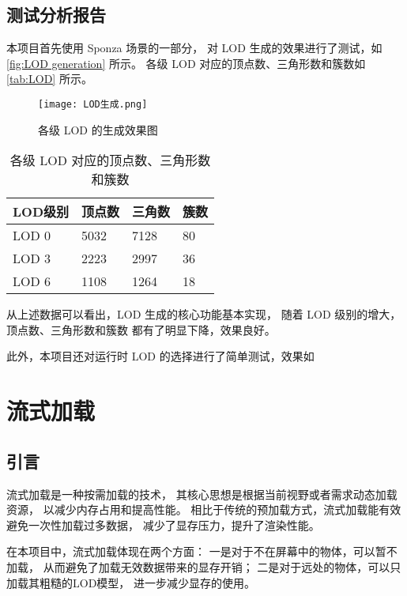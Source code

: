 \subsection{测试分析报告}

本项目首先使用 Sponza 场景的一部分，
对 LOD 生成的效果进行了测试，如\autoref{fig:LOD generation} 所示。
各级 LOD 对应的顶点数、三角形数和簇数如\autoref{tab:LOD} 所示。

\begin{figure}[!htb]
    \centering
    \texttt{[image: LOD生成.png]}
    \caption{\label{fig:LOD generation}各级 LOD 的生成效果图}
\end{figure}

\begin{table}[!htb]
    \caption{\label{tab:LOD}各级 LOD 对应的顶点数、三角形数和簇数}
    \begin{tabularx}{\linewidth}{|X<{\centering}|X<{\centering}|X<{\centering}|X<{\centering}|}
        \hline
        LOD级别 & 顶点数 & 三角数 & 簇数 \\ \hline
        LOD 0 & 5032 & 7128 & 80 \\ \hline
        LOD 3 & 2223 & 2997 & 36 \\ \hline
        LOD 6 & 1108 & 1264 & 18 \\ \hline
    \end{tabularx}
\end{table}

从上述数据可以看出，LOD 生成的核心功能基本实现，
随着 LOD 级别的增大，顶点数、三角形数和簇数
都有了明显下降，效果良好。

此外，本项目还对运行时 LOD 的选择进行了简单测试，效果如


\section{流式加载}

\subsection{引言}

流式加载是一种按需加载的技术，
其核心思想是根据当前视野或者需求动态加载资源，
以减少内存占用和提高性能。
相比于传统的预加载方式，流式加载能有效避免一次性加载过多数据，
减少了显存压力，提升了渲染性能。

在本项目中，流式加载体现在两个方面：
一是对于不在屏幕中的物体，可以暂不加载，
从而避免了加载无效数据带来的显存开销；
二是对于远处的物体，可以只加载其粗糙的LOD模型，
进一步减少显存的使用。


